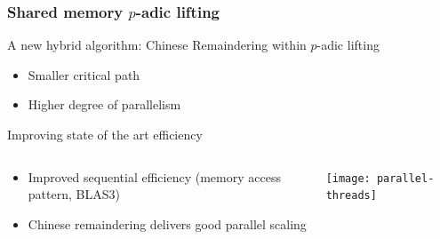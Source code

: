 \documentclass{beamer}
\newcommand{\thus}{\textcolor{red}{\MVRightarrow{}}\xspace}
\begin{document}
\begin{frame}
  \frametitle{Shared memory $p$-adic lifting}

  \begin{block}    {A new hybrid algorithm:  Chinese Remaindering within $p$-adic lifting}
    \begin{itemize}
    \item Smaller critical path
    \item Higher degree of parallelism
    \end{itemize}
  \end{block}

    \begin{block}{Improving state of the art efficiency}
    \begin{columns}
      \begin{column}{.47\textwidth}
        \begin{itemize}
        \item Improved sequential efficiency (memory access pattern, BLAS3)
        \item Chinese remaindering delivers good parallel scaling
        \end{itemize}
      \end{column}
      \begin{column}{.52\textwidth}

        {\texttt{[image: parallel-threads]}}
      \end{column}
    \end{columns}

  \end{block}
\end{frame}
\end{document}
